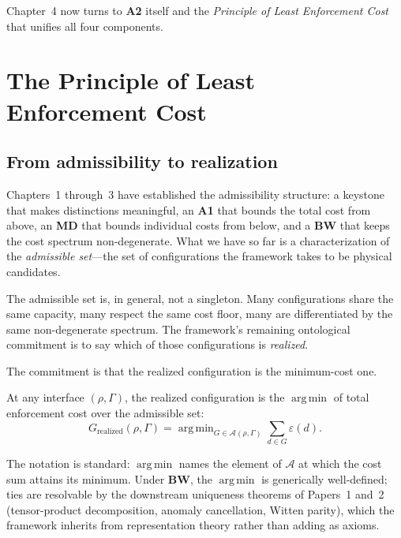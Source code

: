 \documentclass[11pt]{article}
\newcommand{\Aone}{\textbf{A1}}
\newcommand{\argmin}{\mathop{\mathrm{arg\,min}}}
\begin{document}
Chapter~4 now turns to \textbf{A2} itself and the \emph{Principle of Least Enforcement Cost} that unifies all four components.

\clearpage

\section{The Principle of Least Enforcement Cost}\label{sec:PLEC}

\subsection{From admissibility to realization}\label{sec:PLEC_from_admissibility}

Chapters~1 through~3 have established the admissibility structure: a keystone that makes distinctions meaningful, an \Aone{} that bounds the total cost from above, an \textbf{MD} that bounds individual costs from below, and a \textbf{BW} that keeps the cost spectrum non-degenerate. What we have so far is a characterization of the \emph{admissible set}---the set of configurations the framework takes to be physical candidates.

The admissible set is, in general, not a singleton. Many configurations share the same capacity, many respect the same cost floor, many are differentiated by the same non-degenerate spectrum. The framework's remaining ontological commitment is to say which of those configurations is \emph{realized}.

The commitment is that the realized configuration is the minimum-cost one.

\begin{tcolorbox}[apfbox, title={Axiom A2 --- Minimum-Cost Realization}]
At any interface $(\rho, \Gamma)$, the realized configuration is the $\argmin$ of total enforcement cost over the admissible set:
\[
G_{\mathrm{realized}}(\rho, \Gamma) = \argmin_{G \in \mathcal{A}(\rho, \Gamma)} \sum_{d \in G} \varepsilon(d).
\]
\end{tcolorbox}

\noindent The notation is standard: $\argmin$ names the element of $\mathcal{A}$ at which the cost sum attains its minimum. Under \textbf{BW}, the $\argmin$ is generically well-defined; ties are resolvable by the downstream uniqueness theorems of Papers~1 and~2 (tensor-product decomposition, anomaly cancellation, Witten parity), which the framework inherits from representation theory rather than adding as axioms.
\end{document}
